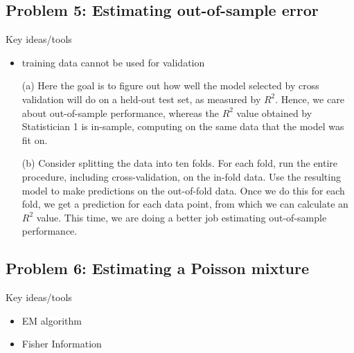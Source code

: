 \subsection*{Problem 5: Estimating out-of-sample error}

Key ideas/tools
\begin{itemize}
\item training data cannot be used for validation
\end{itemize}


\begin{enumerate}
\item[(a)] Here the goal is to figure out how well the model selected by cross validation will do on a held-out test set, as measured by $R^2$. Hence, we care about out-of-sample performance, whereas the $R^2$ value obtained by Statistician 1 is in-sample, computing on the same data that the model was fit on.

\item[(b)] Consider splitting the data into ten folds. For each fold, run the entire procedure, including cross-validation, on the in-fold data. Use the resulting model to make predictions on the out-of-fold data. Once we do this for each fold, we get a prediction for each data point, from which we can calculate an $R^2$ value. This time, we are doing a better job estimating out-of-sample performance.


\end{enumerate}



\subsection*{Problem 6: Estimating a Poisson mixture}

Key ideas/tools
\begin{itemize}
\item EM algorithm
\item Fisher Information
\end{itemize}


